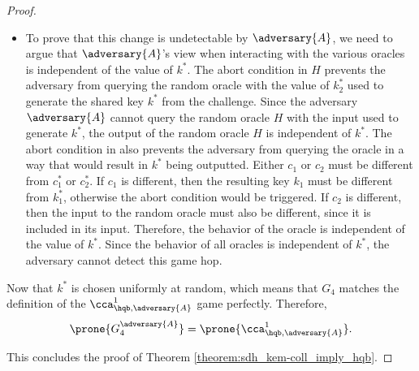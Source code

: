\begin{proof}
\begin{itemize}
                                                                                        \item[\emph{Proof}]
                                                                                            To prove that this change is undetectable by $\adversary{A}$, we need to argue that $\adversary{A}$'s view when interacting with the various oracles is independent of the value of $k^*$.
                                                                                            The abort condition in $H$ prevents the adversary from querying the random oracle with the value of $k^*_2$ used to generate the shared key $k^*$ from the challenge.
                                                                                            Since the adversary $\adversary{A}$ cannot query the random oracle $H$ with the input used to generate $k^*$, the output of the random oracle $H$ is independent of $k^*$.
                                                                                            The abort condition in \dec also prevents the adversary from querying the \dec oracle in a way that would result in $k^*$ being outputted.
                                                                                            Either $c_1$ or $c_2$ must be different from $c^*_1$ or $c^*_2$.
                                                                                            If $c_1$ is different, then the resulting key $k_1$ must be different from $k^*_1$, otherwise the abort condition would be triggered.
                                                                                            If $c_2$ is different, then the input to the random oracle must also be different, since it is included in its input.
                                                                                            Therefore, the behavior of the \dec oracle is independent of the value of $k^*$.
                                                                                            Since the behavior of all oracles is independent of $k^*$, the adversary cannot detect this game hop.
                                                                                        \end{itemize}

                                                                                    \item Now that $k^*$ is chosen uniformly at random, which means that $G_4$ matches the definition of the $\cca^1_{\hqb,\adversary{A}}$ game perfectly. Therefore,
                                                                                        \[ \prone{G^{\adversary{A}}_4} = \prone{\cca^1_{\hqb,\adversary{A}}}. \]

                                                                                    \item This concludes the proof of Theorem \ref{theorem:sdh_kem-coll_imply_hqb}.

                                                                                    \end{proof}
